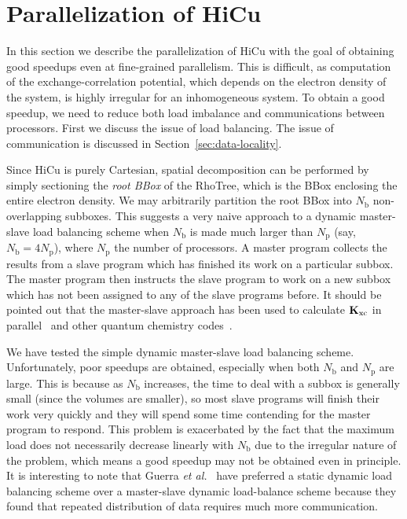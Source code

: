 \documentclass[preprint]{revtex4}
\newcommand{\Kxc}{{\bf K}_{\mathrm{xc}}}
\newcommand{\Np}{N_{\mathrm{p}}} \newcommand{\Nbox}{N_{\mathrm{b}}}
\begin{document}
\section{Parallelization of HiCu}
\label{sec:parahicu}
In this section we describe the parallelization of HiCu with the goal
of obtaining good speedups even at fine-grained parallelism.  This is
difficult, as computation of the exchange-correlation potential, which
depends on the electron density of the system, is highly irregular for
an inhomogeneous system.  To obtain a good speedup, we need to reduce
both load imbalance and communications between processors. First we
discuss the issue of load balancing. The issue of communication is
discussed in Section~\ref{sec:data-locality}.

Since HiCu is purely Cartesian, spatial decomposition can be performed
by simply sectioning the {\it root BBox} of the RhoTree, which is the BBox
enclosing the entire electron density.  We may arbitrarily partition
the root BBox into $\Nbox$ non-overlapping subboxes.  This suggests a
very naive approach to a dynamic master-slave load balancing scheme
when $\Nbox$ is made much larger than $\Np$ (say, $\Nbox= 4\Np$),
where $\Np$ the number of processors. A master program collects the
results from a slave program which has finished its work on a
particular subbox. The master program then instructs the slave program
to work on a new subbox which has not been assigned to any of the
slave programs before. It should be pointed out that the master-slave
approach has been used to calculate $\Kxc$ in
parallel~\cite{Furlani_00v128,Yoshihiro_01v346} and other quantum
chemistry codes~\cite{Baker_02v23}.

We have tested the simple dynamic master-slave load balancing
scheme. Unfortunately, poor speedups are obtained, especially when
both $\Nbox$ and $\Np$ are large.  This is because as $\Nbox$
increases, the time to deal with a subbox is generally small (since
the volumes are smaller), so most slave programs will finish their
work very quickly and they will spend some time contending for the
master program to respond. This problem is exacerbated by the fact
that the maximum load does not necessarily decrease linearly with
$\Nbox$ due to the irregular nature of the problem, which means a good
speedup may not be obtained even in principle.  It is interesting to
note that Guerra {\it et al.}\/~\cite{Guerra_95} have preferred a
static dynamic load balancing scheme over a master-slave dynamic
load-balance scheme because they found that repeated distribution of
data requires much more communication.
\end{document}
